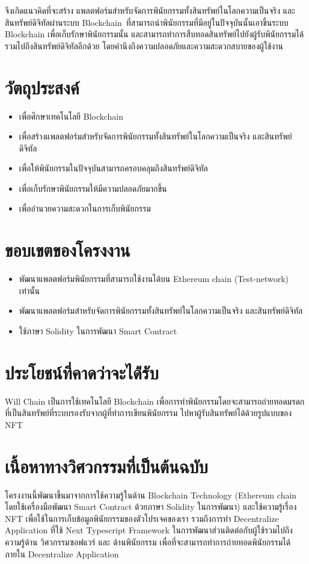 \documentclass[12pt,oneside,openright,a4paper]{cpe-thai-project}
\begin{document}
\tab จึงเกิดแนวคิดที่จะสร้าง แพลตฟอร์มสำหรับจัดการพินัยกรรมทั้งสินทรัพย์ในโลกความเป็นจริง และสินทรัพย์ดิจิทัลผ่านระบบ Blockchain\ ที่สามารถนำพินัยกรรมที่มีอยู่ในปัจจุบันนั้นเอาขึ้นระบบ Blockchain เพื่อเก็บรักษาพินัยกรรมนั้น และสามารถทำการสืบทอดสินทรัพย์ไปยังผู้รับพินัยกรรมได้ รวมไปถึงสินทรัพย์ดิจิทัลอีกด้วย โดยคำนึงถึงความปลอดภัยและความสะดวกสบายของผู้ใช้งาน


\section{วัตถุประสงค์}

\begin{itemize}
\item เพื่อศึกษาเทคโนโลยี Blockchain
\item เพื่อสร้างแพลตฟอร์มสำหรับจัดการพินัยกรรมทั้งสินทรัพย์ในโลกความเป็นจริง และสินทรัพย์ดิจิทัล
\item เพื่อให้พินัยกรรมในปัจจุบันสามารถครอบคลุมถึงสินทรัพย์ดิจิทัล
\item เพื่อเก็บรักษาพินัยกรรมให้มีความปลอดภัยมากขึ้น
\item เพื่ออำนวยความสะดวกในการเก็บพินัยกรรม
\end{itemize}

\section{ขอบเขตของโครงงาน}

\begin{itemize}
\item พัฒนาแพลตฟอร์มพินัยกรรมที่สามารถใช้งานได้บน Ethereum chain (Test-network) เท่านั้น
\item พัฒนาแพลตฟอร์มสำหรับจัดการพินัยกรรมทั้งสินทรัพย์ในโลกความเป็นจริง และสินทรัพย์ดิจิทัล
\item ใช้ภาษา Solidity ในการพัฒนา Smart Contract
\end{itemize}

\section{ประโยชน์ที่คาดว่าจะได้่รับ}
\tab Will Chain เป็นการใช้เทคโนโลยี Blockchain เพื่อการทำพินัยกรรมโดยจะสามารถถ่ายทอดมรดกที่เป็นสินทรัพย์ที่ระบบรองรับจากผู้ที่ทำการเขียนพินัยกรรม ไปหาผู้รับสินทรัพย์ได้ด้วยรูปแบบของ NFT
\section{เนื้อหาทางวิศวกรรมที่เป็นต้นฉบับ}
\tab โครงงานนี้พัฒนาขึ้นมาจากการใช้ความรู้ในด้าน Blockchain Technology (Ethereum chain โดยใช้เครื่องมือพัฒนา Smart Contract ด้วยภาษา Solidity ในการพัฒนา)  และใช้ความรู้เรื่อง NFT เพื่อใช้ในการเก็บข้อมูลพินัยกรรมของตัวโปรเจคของเรา รวมถึงการทำ Decentralize  Application ที่ใช้ Next Typescript Framework ในการพัฒนาส่วนติดต่อกับผู้ใช้รวมไปถึงความรู้ด้าน วิศวกรรมซอฟแวร์ และ ด้านพินัยกรรม เพื่อที่จะสามารถทำการถ่ายทอดพินัยกรรมได้ภายใน Decentralize  Application
\clearpage
\end{document}
